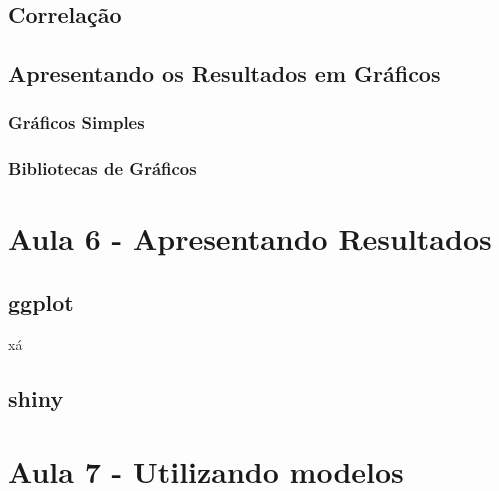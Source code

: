 \documentclass[12pt,a4paper,oneside]{erdc}
\begin{document}
	\section{Correlação}
	
	\section{Apresentando os Resultados em Gráficos}
	
		\subsection{Gráficos Simples}
		
		\subsection{Bibliotecas de Gráficos}





%
%


%
%
%



\chapter{Aula 6 - Apresentando Resultados}

	\section{ggplot}
	xá

	\section{shiny}

%
%


%
%
%


\chapter{Aula 7 - Utilizando modelos}
\end{document}
